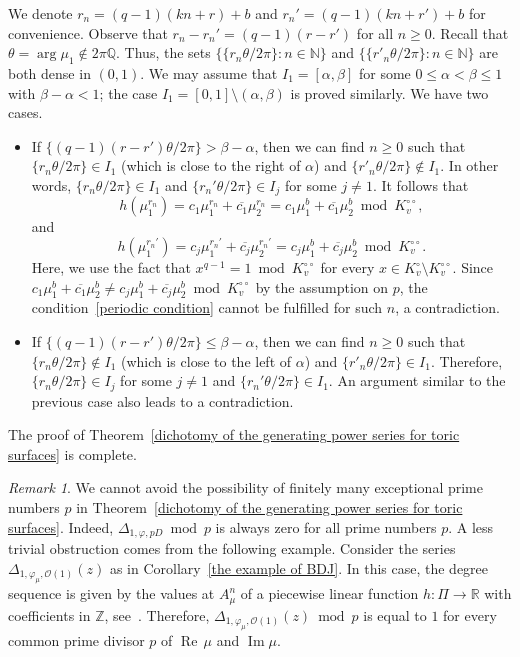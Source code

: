 \documentclass[11pt,a4paper]{article}
\theoremstyle{plain}
\theoremstyle{remark}
\newtheorem{remark}[theorem]{Remark}
\theoremstyle{custombold}
\DeclareMathOperator{\im}{\mathrm{Im}}
\newcommand{\re}{{\operatorname{Re}\,}}
\begin{document}
We denote $r_n=(q-1)(kn+r)+b$ and $r_n'=(q-1)(kn+r')+b$ for convenience. Observe that $r_n-r_n'=(q-1)(r-r')$ for all $n\geq0$. Recall that $\theta=\arg\mu_1\not\in2\pi\mathbb Q$. Thus, the sets $\{\{r_n\theta/2\pi\}:n\in\mathbb N\}$ and $\{\{r'_n\theta/2\pi\}:n\in\mathbb N\}$ are both dense in $(0,1)$. We may assume that $I_1=[\alpha,\beta]$ for some $0\leq \alpha<\beta\leq 1$ with $\beta-\alpha<1$; the case $I_1=[0,1]\setminus(\alpha,\beta)$ is proved similarly. We have two cases.
\begin{itemize}
\item If $\{(q-1)(r-r')\theta/2\pi\}>\beta-\alpha$, then we can find $n\geq0$ such that $\{r_n\theta/2\pi\}\in I_1$ (which is close to the right of $\alpha$) and $\{r'_n\theta/2\pi\}\not\in I_1$. In other words, $\{r_n\theta/2\pi\}\in I_1$ and $\{r_n'\theta/2\pi\}\in I_j$ for some $j\neq 1$. It follows that \[ h(\mu_1^{r_n})=c_1\mu_1^{r_n}+\overline{c_1}\mu_2^{r_n}= c_1\mu_1^b+\overline{c_1}\mu_2^b\bmod K_v^{\circ\circ},\]
and \[ h(\mu_1^{r_n'})=c_j\mu_1^{r_n'}+\overline{c_j}\mu_2^{r_n'}= c_j\mu_1^b+\overline{c_j}\mu_2^b\bmod K_v^{\circ\circ}.\]
Here, we use the fact that $x^{q-1}= 1\bmod K_v^{\circ\circ}$ for every $x\in K_v^{\circ}\setminus K_v^{\circ\circ}$. Since $c_1\mu_1^b+\overline{c_1}\mu_2^b\not= c_j\mu_1^b+\overline{c_j}\mu_2^b\bmod K_v^{\circ\circ}$ by the assumption on $p$, the condition~\eqref{periodic condition} cannot be fulfilled for such $n$, a contradiction.

    \item If $\{(q-1)(r-r')\theta/2\pi\}\leq\beta-\alpha$, then we can find $n\geq0$ such that $\{r_n\theta/2\pi\}\not\in I_1$ (which is close to the left of $\alpha$) and $\{r'_n\theta/2\pi\}\in I_1$. Therefore, $\{r_n\theta/2\pi\}\in I_j$ for some $j\neq 1$ and $\{r_n'\theta/2\pi\}\in I_1$. An argument similar to the previous case also leads to a contradiction.
\end{itemize} 
The proof of Theorem~\ref{dichotomy of the generating power series for toric surfaces} is complete.

\begin{remark}
We cannot avoid the possibility of finitely many exceptional prime numbers $p$ in Theorem~\ref{dichotomy of the generating power series for toric surfaces}. Indeed, $\Delta_{1,\varphi,pD}\bmod p$ is always zero for all prime numbers $p$. A less trivial obstruction comes from the following example. Consider the series $\Delta_{1,\varphi_\mu,\mathcal{O}(1)}(z)$ as in Corollary~\ref{the example of BDJ}. In this case, the degree sequence is given by the values at $A_\mu^n$ of a piecewise linear function $h\colon \Pi\rightarrow\mathbb R$ with coefficients in $\mathbb Z$, see~\cite[Formula~(1.1)]{BDJ-2020}. Therefore, $\Delta_{1,\varphi_\mu,\mathcal{O}(1)}(z)\bmod p$ is equal to $1$ for every common prime divisor $p$ of $\re \mu$ and $\im \mu$.
\end{remark}
\end{document}
